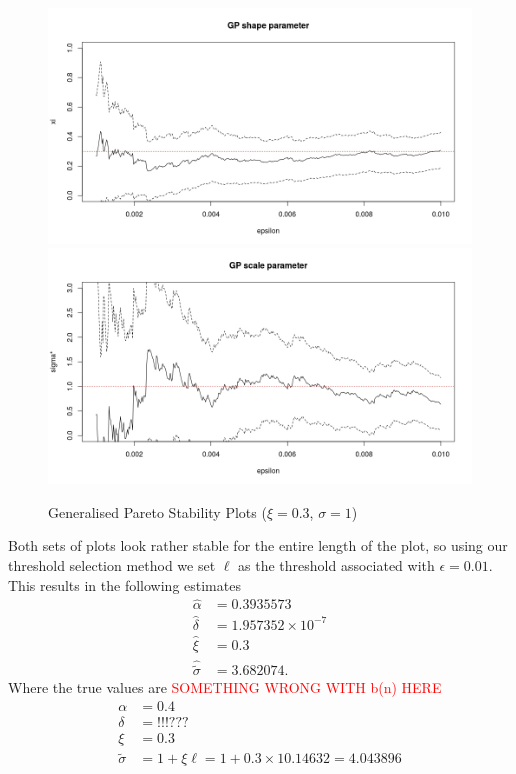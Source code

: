 \documentclass[honours,12pt]{unswthesis}
\newcommand{\1}{\mathbf 1}
\numberwithin{equation}{section}
\theoremstyle{definition}
\theoremstyle{remark}
\begin{document}
\begin{figure}[h]
    \centering
    \includegraphics[width=\textwidth]{Figures/GPshape01}
    \includegraphics[width=\textwidth]{Figures/GPscale01}
    \caption{Generalised Pareto Stability Plots ($\xi=0.3$, $\sigma=1$)}\label{fig:MLstability}
\end{figure}
Both sets of plots look rather stable for the entire length of the plot, so using our threshold selection method we set $\ell$ as the threshold associated with $\epsilon=0.01$. This results in the following estimates
\begin{align*}
\hat \alpha &= 0.3935573\\
\hat \delta &= 1.957352\times10^{-7}\\
\hat \xi &= 0.3\\
\hat {\tilde \sigma} &= 3.682074.
\end{align*} 
Where the true values are \textcolor{red}{SOMETHING WRONG WITH b(n) HERE}
\begin{align*}
 \alpha &= 0.4\\
 \delta &= !!!??? \\
 \xi &= 0.3\\
 {\tilde \sigma} &= 1+\xi\ell =1+0.3\times 10.14632 = 4.043896
\end{align*} 
\end{document}
